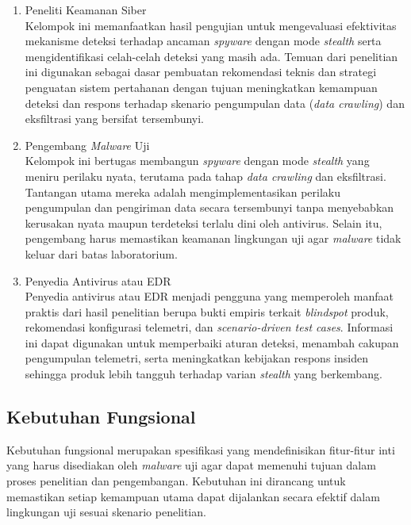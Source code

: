 \begin{enumerate}
    \item Peneliti Keamanan Siber \\
    Kelompok ini memanfaatkan hasil pengujian untuk mengevaluasi efektivitas mekanisme deteksi terhadap ancaman \textit{spyware} dengan mode \textit{stealth} serta mengidentifikasi celah-celah deteksi yang masih ada. Temuan dari penelitian ini digunakan sebagai dasar pembuatan rekomendasi teknis dan strategi penguatan sistem pertahanan dengan tujuan meningkatkan kemampuan deteksi dan respons terhadap skenario pengumpulan data (\textit{data crawling}) dan eksfiltrasi yang bersifat tersembunyi.

    \item Pengembang \textit{Malware} Uji \\
    Kelompok ini bertugas membangun \textit{spyware} dengan mode \textit{stealth} yang meniru perilaku nyata, terutama pada tahap \textit{data crawling} dan eksfiltrasi. Tantangan utama mereka adalah mengimplementasikan perilaku pengumpulan dan pengiriman data secara tersembunyi tanpa menyebabkan kerusakan nyata maupun terdeteksi terlalu dini oleh antivirus. Selain itu, pengembang harus memastikan keamanan lingkungan uji agar \textit{malware} tidak keluar dari batas laboratorium.

    \item Penyedia Antivirus atau EDR \\
    Penyedia antivirus atau EDR menjadi pengguna yang memperoleh manfaat praktis dari hasil penelitian berupa bukti empiris terkait \textit{blindspot} produk, rekomendasi konfigurasi telemetri, dan \textit{scenario-driven test cases}. Informasi ini dapat digunakan untuk memperbaiki aturan deteksi, menambah cakupan pengumpulan telemetri, serta meningkatkan kebijakan respons insiden sehingga produk lebih tangguh terhadap varian \textit{stealth} yang berkembang.
\end{enumerate}

\subsection{Kebutuhan Fungsional}

Kebutuhan fungsional merupakan spesifikasi yang mendefinisikan fitur-fitur inti 
yang harus disediakan oleh \textit{malware} uji agar dapat memenuhi tujuan dalam 
proses penelitian dan pengembangan. Kebutuhan ini dirancang untuk memastikan 
setiap kemampuan utama dapat dijalankan secara efektif dalam lingkungan uji 
sesuai skenario penelitian.

